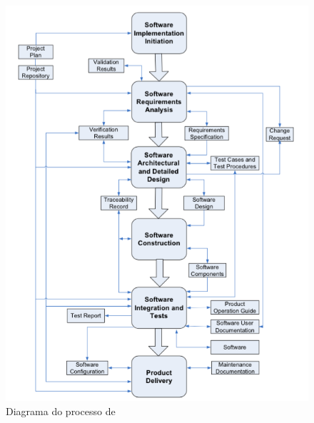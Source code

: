 \begin{figure}[!h]
\centering
\includegraphics[scale=0.5]{figuras/dsw_diagr.png}
\caption{Diagrama do processo de \dsw \cite[pág. 30]{iso}}
\label{fig:dsw:diagr}
\end{figure}

